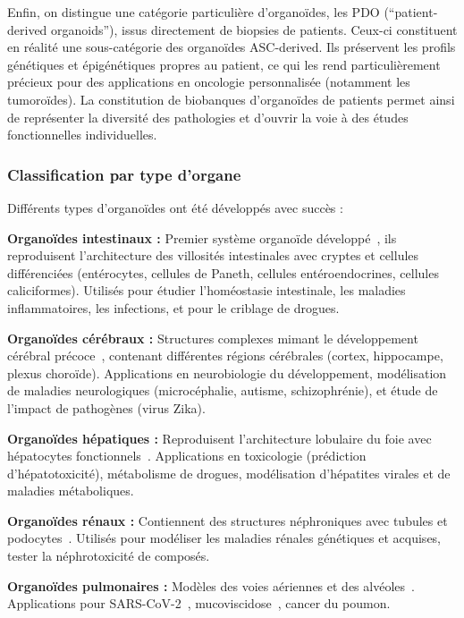 Enfin, on distingue une catégorie particulière d'organoïdes, les PDO (``patient-derived organoids''), issus directement de biopsies de patients. Ceux-ci constituent en réalité une sous-catégorie des organoïdes ASC-derived. Ils préservent les profils génétiques et épigénétiques propres au patient, ce qui les rend particulièrement précieux pour des applications en oncologie personnalisée (notamment les tumoroïdes). La constitution de biobanques d'organoïdes de patients permet ainsi de représenter la diversité des pathologies et d'ouvrir la voie à des études fonctionnelles individuelles.

\subsubsection{Classification par type d'organe}

Différents types d'organoïdes ont été développés avec succès :

\textbf{Organoïdes intestinaux :}
Premier système organoïde développé~\cite{Sato2009}, ils reproduisent l'architecture des villosités intestinales avec cryptes et cellules différenciées (entérocytes, cellules de Paneth, cellules entéroendocrines, cellules caliciformes). Utilisés pour étudier l'homéostasie intestinale, les maladies inflammatoires, les infections, et pour le criblage de drogues.

\textbf{Organoïdes cérébraux :}
Structures complexes mimant le développement cérébral précoce~\cite{Lancaster2013}, contenant différentes régions cérébrales (cortex, hippocampe, plexus choroïde). Applications en neurobiologie du développement, modélisation de maladies neurologiques (microcéphalie, autisme, schizophrénie), et étude de l'impact de pathogènes (virus Zika).

\textbf{Organoïdes hépatiques :}
Reproduisent l'architecture lobulaire du foie avec hépatocytes fonctionnels~\cite{Huch2015}. Applications en toxicologie (prédiction d'hépatotoxicité), métabolisme de drogues, modélisation d'hépatites virales et de maladies métaboliques.

\textbf{Organoïdes rénaux :}
Contiennent des structures néphroniques avec tubules et podocytes~\cite{Takasato2015}. Utilisés pour modéliser les maladies rénales génétiques et acquises, tester la néphrotoxicité de composés.

\textbf{Organoïdes pulmonaires :}
Modèles des voies aériennes et des alvéoles~\cite{Sachs2019}. Applications pour SARS-CoV-2~\cite{Zhou2020COVID}, mucoviscidose~\cite{Dekkers2013}, cancer du poumon.

